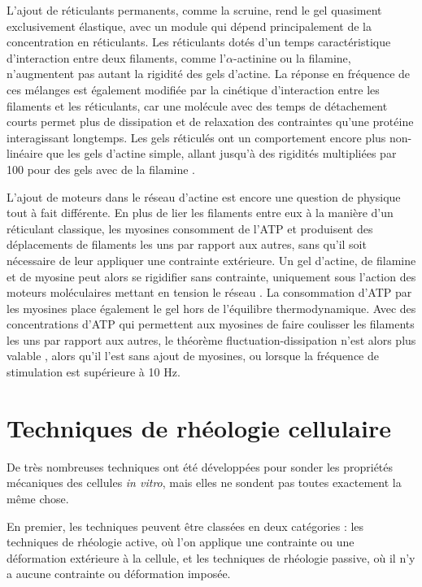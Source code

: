 \documentclass{report}
\begin{document}
L'ajout de réticulants permanents, comme la scruine, rend le gel quasiment exclusivement élastique, avec un module qui dépend principalement de la concentration en réticulants. 
Les réticulants dotés d'un temps caractéristique d'interaction entre deux filaments, comme l'$\alpha$-actinine ou la filamine, n'augmentent pas autant la rigidité des gels d'actine. 
La réponse en fréquence de ces mélanges est également modifiée par la cinétique d'interaction entre les filaments et les réticulants, car une molécule avec des temps de détachement courts permet plus de dissipation et de relaxation des contraintes qu'une protéine interagissant longtemps. 
Les gels réticulés ont un comportement encore plus non-linéaire que les gels d'actine simple, allant jusqu'à des rigidités multipliées par 100 pour des gels avec de la filamine \cite{gardel}. 

L'ajout de moteurs dans le réseau d'actine est encore une question de physique tout à fait différente. En plus de lier les filaments entre eux à la manière d'un réticulant classique, les myosines consomment de l'ATP et produisent des déplacements de filaments les uns par rapport aux autres, sans qu'il soit nécessaire de leur appliquer une contrainte extérieure. 
Un gel d'actine, de filamine et de myosine peut alors se rigidifier sans contrainte, uniquement sous l'action des moteurs moléculaires mettant en tension le réseau \cite{koenderink}. 
La consommation d'ATP par les myosines place également le gel hors de l'équilibre thermodynamique. 
Avec des concentrations d'ATP qui permettent aux myosines de faire coulisser les filaments les uns par rapport aux autres, le théorème fluctuation-dissipation n'est alors plus valable \cite{mizuno}, alors qu'il l'est sans ajout de myosines, ou lorsque la fréquence de stimulation est supérieure à 10 Hz. 



\section{Techniques de rhéologie cellulaire}

De très nombreuses techniques ont été développées pour sonder les propriétés mécaniques des cellules \textit{in vitro}, mais elles ne sondent pas toutes exactement la même chose. 

En premier, les techniques peuvent être classées en deux catégories : les techniques de rhéologie active, où l'on applique une contrainte ou une déformation extérieure à la cellule, et les techniques de rhéologie passive, où il n'y a aucune contrainte ou déformation imposée. 
\end{document}
